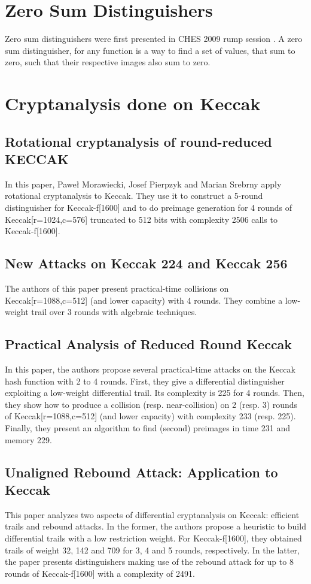 \section{Zero Sum Distinguishers}
Zero sum distinguishers were first presented in CHES 2009 rump session \cite{00014}. A zero sum distinguisher, for any
function is a way to find a set of values, that sum to zero, such that their respective images also sum to zero.

\section{Cryptanalysis done on Keccak}

\subsection{Rotational cryptanalysis of round-reduced KECCAK} \cite{00022}
In this paper, Paweł Morawiecki, Josef Pierpzyk and Marian Srebrny apply rotational cryptanalysis to Keccak. 
They use it to construct a 5-round distinguisher for Keccak-f[1600] and to do preimage generation for 4 rounds of 
Keccak[r=1024,c=576] truncated to 512 bits with complexity 2506 calls to Keccak-f[1600].

\subsection{New Attacks on Keccak 224 and Keccak 256} \cite{00023}
The authors of this paper present practical-time collisions on Keccak[r=1088,c=512] (and lower capacity) with 4 rounds. 
They combine a low-weight trail over 3 rounds with algebraic techniques.

\subsection{Practical Analysis of Reduced Round Keccak} \cite{00024}
In this paper, the authors propose several practical-time attacks on the Keccak hash function with 2 to 4 rounds. 
First, they give a differential distinguisher exploiting a low-weight differential trail. Its complexity is 225 for 4 
rounds. Then, they show how to produce a collision (resp. near-collision) on 2 (resp. 3) rounds of Keccak[r=1088,c=512] 
(and lower capacity) with complexity 233 (resp. 225). Finally, they present an algorithm to find (second) preimages in 
time 231 and memory 229.

\subsection{Unaligned Rebound Attack: Application to Keccak} \cite{00025}
This paper analyzes two aspects of differential cryptanalysis on Keccak: efficient trails and rebound attacks. In the 
former, the authors propose a heuristic to build differential trails with a low restriction weight. For Keccak-f[1600], 
they obtained trails of weight 32, 142 and 709 for 3, 4 and 5 rounds, respectively. In the latter, the paper presents 
distinguishers making use of the rebound attack for up to 8 rounds of Keccak-f[1600] with a complexity of 2491.

